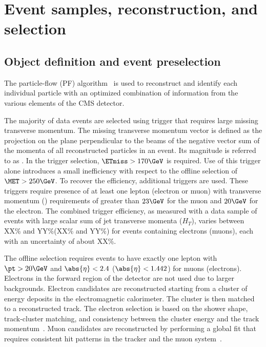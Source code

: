 \section{Event samples, reconstruction, and selection}
\subsection{Object definition and event preselection}
\label{sec:presel}
The particle-flow (PF) algorithm~\cite{CMS-PAS-PFT-09-001,CMS-PAS-PFT-10-001} is used to reconstruct and 
identify each individual particle with an optimized combination of information from the various elements of the CMS detector.

The majority of data events are selected using trigger that requires large missing transverse momentum. The missing transverse momentum 
vector \ptvecmiss is defined as the projection on the plane perpendicular to the beams of the negative vector sum of the momenta of all 
reconstructed particles in an event. Its magnitude is referred to as \ETmiss. In the trigger selection, $\ETmiss>170\GeV$ is required. 
Use of this trigger alone introduces a small inefficiency with respect to the offline selection of $\MET > 250\GeV$. To recover the efficiency, 
additional triggers are used. These triggers require presence of at least one lepton (electron or muon) with transverse momentum (\pt) 
requirements of greater than $23\GeV$ for the muon and $20\GeV$ for the electron. The combined trigger efficiency, as measured with a data 
sample of events with large scalar sum of jet transverse momenta ($H_{T}$), varies between XX\% and YY\%(XX\% and YY\%) for events containing 
electrons (muons), each with an uncertainty of about XX\%.

The offline selection requires events to have exactly one lepton with $\pt > 20 \GeV$ and $\abs{\eta} < 2.4$ ($\abs{\eta} < 1.442$) 
for muons (electrons). Electrons in the forward region of the detector are not used due to larger backgrounds. 
Electron candidates are reconstructed starting from a cluster of energy deposits in the
electromagnetic calorimeter. The cluster is then matched to a reconstructed track. The electron selection is based on the shower shape,
track-cluster matching, and consistency between the cluster energy and the track momentum~\cite{Khachatryan:2015hwa}. Muon candidates are 
reconstructed by performing a global fit that requires consistent hit patterns in the tracker and the muon system~\cite{MUOART}.

